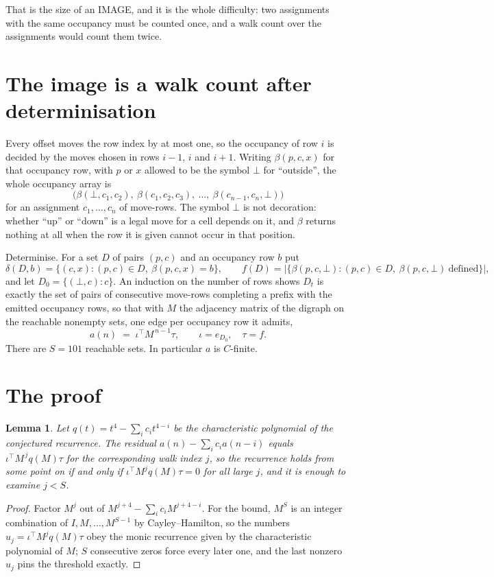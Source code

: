 \documentclass[11pt,a4paper]{article}
\theoremstyle{plain}
\newtheorem{lemma}[theorem]{Lemma}
\theoremstyle{definition}
\begin{document}
That is the size of an IMAGE, and it is the whole difficulty: two assignments with the same
occupancy must be counted once, and a walk count over the assignments would count them twice.

\section{The image is a walk count after determinisation}

Every offset moves the row index by at most one, so the occupancy of row $i$ is decided by the
moves chosen in rows $i-1$, $i$ and $i+1$. Writing $\beta(p,c,x)$ for that occupancy row, with
$p$ or $x$ allowed to be the symbol $\bot$ for ``outside'', the whole occupancy array is
\[
\bigl(\beta(\bot,c_1,c_2),\ \beta(c_1,c_2,c_3),\ \dots,\ \beta(c_{n-1},c_n,\bot)\bigr)
\]
for an assignment $c_1,\dots,c_n$ of move-rows. The symbol $\bot$ is not decoration: whether
``up'' or ``down'' is a legal move for a cell depends on it, and $\beta$ returns nothing at all
when the row it is given cannot occur in that position.

Determinise. For a set $D$ of pairs $(p,c)$ and an occupancy row $b$ put
\[
\delta(D,b)=\{(c,x):(p,c)\in D,\ \beta(p,c,x)=b\},\qquad
f(D)=\bigl|\{\beta(p,c,\bot):(p,c)\in D,\ \beta(p,c,\bot)\ \text{defined}\}\bigr| ,
\]
and let $D_0=\{(\bot,c):c\}$. An induction on the number of rows shows $D_t$ is exactly the
set of pairs of consecutive move-rows completing a prefix with the emitted occupancy rows, so
that with $M$ the adjacency matrix of the digraph on the reachable nonempty sets, one edge per
occupancy row it admits,
\[
a(n)\;=\;\iota^{\!\top}M^{\,n-1}\tau,\qquad \iota=e_{D_0},\quad \tau=f .
\]
There are $S=101$ reachable sets. In particular $a$ is $C$-finite.

\section{The proof}

\begin{lemma}\label{lem:crit}
Let $q(t)=t^{4}-\sum_i c_it^{4-i}$ be the characteristic polynomial of the
conjectured recurrence. The residual $a(n)-\sum_ic_ia(n-i)$ equals
$\iota^{\!\top}M^{\,j}q(M)\tau$ for the corresponding walk index $j$, so the recurrence
holds from some point on if and only if $\iota^{\!\top}M^{j}q(M)\tau=0$ for all large $j$,
and it is enough to examine $j<S$.
\end{lemma}

\begin{proof}
Factor $M^{j}$ out of $M^{j+4}-\sum_ic_iM^{j+4-i}$. For the bound, $M^{S}$
is an integer combination of $I,M,\dots,M^{S-1}$ by Cayley--Hamilton, so the numbers
$u_j=\iota^{\!\top}M^{j}q(M)\tau$ obey the monic recurrence given by the characteristic
polynomial of $M$; $S$ consecutive zeros force every later one, and the last nonzero $u_j$
pins the threshold exactly.
\end{proof}
\end{document}
